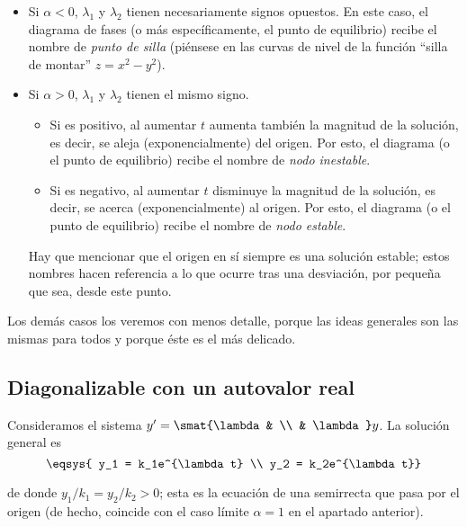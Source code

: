 \documentclass[../ecuaciones_diferenciales.tex]{subfiles}
\begin{document}
\begin{itemize}
	\item Si \(\alpha < 0\), \(\lambda_1\) y \(\lambda_2\) tienen necesariamente
	      signos opuestos. En este caso, el diagrama de fases (o más específicamente, el
	      punto de equilibrio) recibe el nombre de \emph{punto de silla} (piénsese en
	      las curvas de nivel de la función ``silla de montar'' \(z = x^2 - y^2\)).

	\item Si \(\alpha > 0\), \(\lambda_1\) y \(\lambda_2\) tienen el mismo signo.
	      \begin{itemize}
		      \item Si es positivo, al aumentar \(t\) aumenta también la magnitud de la
		            solución, es decir, se aleja (exponencialmente) del origen. Por esto, el
		            diagrama (o el punto de equilibrio) recibe el nombre de \emph{nodo
			            inestable}.
		      \item Si es negativo, al aumentar \(t\) disminuye la magnitud de la solución,
		            es decir, se acerca (exponencialmente) al origen. Por esto, el diagrama (o
		            el punto de equilibrio) recibe el nombre de \emph{nodo estable}.
	      \end{itemize}
	      Hay que mencionar que el origen en sí siempre es una solución estable; estos
	      nombres hacen referencia a lo que ocurre tras una desviación, por pequeña que
	      sea, desde este punto.
\end{itemize}

Los demás casos los veremos con menos detalle, porque las ideas generales son
las mismas para todos y porque éste es el más delicado.

\subsection{Diagonalizable con un autovalor real}

Consideramos el sistema \(y' = \smat{\lambda & \\ & \lambda} y\). La solución
general es
\[\eqsys{
	y_1 = k_1e^{\lambda t} \\
	y_2 = k_2e^{\lambda t}}\]

de donde \(y_1/k_1 = y_2/k_2 > 0\); esta es la ecuación de una semirrecta que
pasa por el origen (de hecho, coincide con el caso límite \(\alpha = 1\) en el
apartado anterior).
\end{document}
